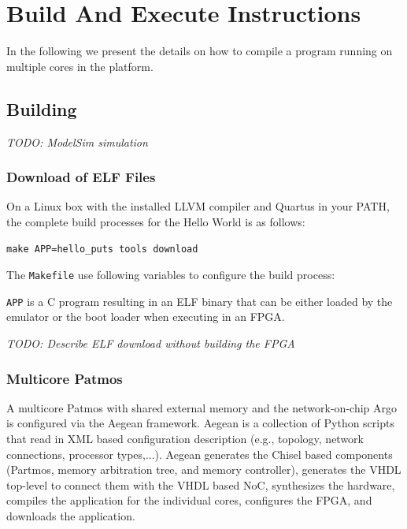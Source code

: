 \documentclass[a4paper,fontsize=10pt,twoside,DIV15,BCOR12mm,headinclude=true,footinclude=false,pagesize,bibtotoc]{scrbook}
\newcommand{\code}[1]{{\texttt{#1}}}
\newcommand{\todo}[1]{{\emph{TODO: #1}}}
\begin{document}
\chapter{Build And Execute Instructions}
\label{apx:run}

In the following we present the details on how to compile 
a program running on multiple cores in the platform.

\section{Building}

\todo{ModelSim simulation}



\subsection{Download of ELF Files}
\label{sec:elf:files}

On a Linux box with the installed LLVM compiler and Quartus in your PATH,
the complete build processes for the Hello World is as follows:

\begin{verbatim}
make APP=hello_puts tools download
\end{verbatim}

The \code{Makefile} use following variables to configure the build process:

\code{APP} is a C program resulting in an ELF binary that can be either
loaded by the emulator or the boot loader when executing in an FPGA.

\todo{Describe ELF download without building the FPGA}



\subsection{Multicore Patmos}

A multicore Patmos with shared external memory and the network-on-chip Argo is configured via
the Aegean framework. Aegean is a collection of Python scripts that read in XML based configuration
description (e.g., topology, network connections, processor types,...). Aegean generates the Chisel based
components (Partmos, memory arbitration tree, and memory controller), generates the VHDL top-level
to connect them with the VHDL based NoC, synthesizes the hardware, compiles the application for the
individual cores, configures the FPGA, and downloads the application.
\end{document}
